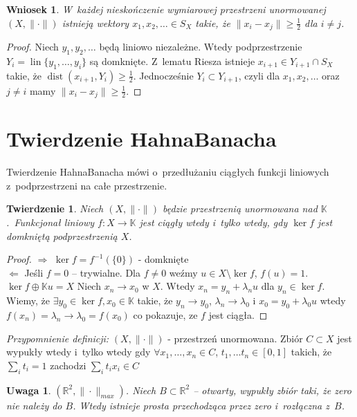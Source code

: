 \documentclass[11pt]{mwrep}
\renewcommand{\[}{\begin{equation}}
\renewcommand{\]}{\end{equation}}
\newcommand{\R}{{\ensuremath{\mathbb R}}}
\newcommand{\K}{\ensuremath{\mathbb{K}}}
\newcommand{\lin}{\operatorname{lin}}
\newcommand{\dist}{\operatorname{dist}}
\newtheorem{twr}[subsection]{Twierdzenie}%
\newtheorem{wn}[subsection]{Wniosek}
\newtheorem{uwaga}[subsection]{Uwaga}
\begin{document}
\begin{wn}
  W~każdej nieskończenie wymiarowej przestrzeni unormowanej $(X,\|\cdot\|)$ istnieją wektory $x_1, x_2, \ldots  \in S_X$ 
  takie, że $\|x_i-x_j\|\ge \frac{1}{2}$ dla $i\not= j$.
\end{wn}
\begin{proof}
	Niech $y_1, y_2, \ldots$ będą  liniowo niezależne. Wtedy podprzestrzenie $Y_i = \lin\{y_1,\ldots, y_i \}$ są domknięte.
	Z~lematu Riesza istnieje $x_{i+1}  \in Y_{i+1} \cap S_X$ takie, że $\dist (x_{i+1}, Y_i) \ge \frac{1}{2}$. Jednocześnie $Y_i \subset Y_{i+1}$,
	czyli dla $x_1, x_2, \ldots $ oraz $j\neq i$ mamy $\|x_i-x_j\|\ge \frac{1}{2}$.
\end{proof}
\section{Twierdzenie Hahna\dywiz Banacha}
Twierdzenie Hahna\dywiz Banacha mówi o~przedłużaniu ciągłych funkcji liniowych z~podprzestrzeni na całe przestrzenie.
\begin{twr}
	Niech $(X,\|\cdot\|)$ będzie przestrzenią unormowana nad \K.~Funkcjonał liniowy $f:X\to\K$ jest ciągły wtedy i~tylko wtedy, gdy
	$\ker f$ jest domkniętą podprzestrzenią $X$.
\end{twr}
\begin{proof}
	$\Rightarrow$ $\ker f = f^{-1}(\{0\})$ - domknięte\\
	$\Leftarrow$ Jeśli $f=0$ -- trywialne. Dla $f \not =0$ weźmy $u\in X \setminus \ker f$, $f(u)=1$. $\ker f \oplus \K u = X$ 
	Niech $x_n \to x_0$ w $X$. Wtedy $x_n =y_n + \lambda_n u$ dla $y_n \in \ker f$.
	Wiemy, że $\exists y_0 \in \ker f, x_0 \in \K$ takie, że $y_n \to y_0$, $\lambda_n \to \lambda_0$ i
	$x_0= y_0 +\lambda_0 u$ wtedy  $f(x_n) = \lambda_n\to \lambda_0 = f(x_0)$ co pokazuje, ze $f$ jest ciągła.
\end{proof}
\textit{Przypomnienie definicji:}
$(X,\|\cdot\|)$ - przestrzeń unormowana. Zbiór  $C\subset X$ jest wypukły  wtedy i~tylko wtedy gdy 
$\forall x_1,\ldots, x_n \in C$, $t_1, \ldots t_n \in [0,1]$ takich, że $\sum_i t_i = 1$ zachodzi $\sum_i t_i x_i \in C$
\begin{uwaga}
  \label{uw1_r}
	$(\R^2,\|\cdot\|_{max})$. Niech $B\subset \R^2$ -- otwarty, wypukły zbiór taki, że zero nie należy do $B$.
	Wtedy istnieje prosta przechodząca przez zero i~rozłączna z~$B$.
\end{uwaga}
\end{document}
